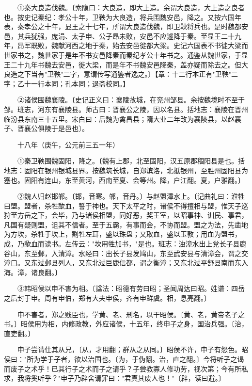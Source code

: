 　　①秦大良造伐魏。〔索隐曰：大良造，即大上造。余谓大良造，大上造之良者也。按史记秦纪：孝公十年，卫鞅为大良造，将兵围魏安邑，降之。又按六国年表，秦孝公之十年，显王之十七年，所谓大良造伐魏，即卫鞅将兵也。是时魏都安邑，其兵犹强，庞涓、太子申、公子昂未败，安邑不应遽降于秦。至显王二十九年，昂军既败，魏献河西之地于秦，始去安邑徙都大梁。史记六国表不书徙大梁而世家书之，魏世家于是年不书安邑降秦而秦纪孝公十年书之。通鉴从魏世家，于显王二十九年书魏去安邑，徙大梁，而是年不书魏安邑降秦，盖亦疑而除去之。但大良造之下当有"卫鞅"二字，意谓传写通鉴者逸之。〕【章：十二行本正有"卫鞅"二字；乙十一行本同；孔本同；退斋校同。】

　　②诸侯围魏襄陵。〔史记正义曰：襄陵故城，在兖州邹县。余按魏境时不至于邹。班志，河东有襄陵县。师古曰：晋襄公之陵，因以名县。括地志：襄陵在晋州临汾县东南三十五里。宋白曰：后魏为禽昌县；隋大业二年改为襄陵县，以赵襄子、晋襄公俱陵于是邑也〕。

　　十八年（庚午，公元前三五一年）

　　①秦卫鞅围魏固阳，降之。〔魏有上郡，北至固阳，汉五原郡稒阳县是也。括地志：固阳在银州银城县界。按魏筑长城，自郑滨洛，北抵银州，至胜州固阳县为塞也。固阳有连山，东至黄河，西南至夏、会等州。降，户江翻。夏，户雅翻。〕

　　②魏人归赵邯郸。〔邯，音寒。郸，音丹。〕与赵盟漳水上。〔记曲礼曰：涖牲曰盟。盟者，杀牲歃血，誓于神也。天下太平之时，诸侯不得擅相与盟，惟天子巡狩至方岳之下，会毕，乃与诸侯相盟，同好恶，奖王室，以昭事神、训民、事君，凡国有疑则盟，诅其不信者。至于五霸，有事而会，不协而盟。盟之为法，先凿地为方坎，杀牲于坎上，割牲左耳，盛以珠盘；又取血，盛以玉敦；用血为盟书，成，乃歃血而读书。左传云："坎用牲加书，"是也。班志：浊漳水出上党长子县鹿谷山，东至邺，入清漳。水经曰：出长子县发鸠山，东至武安县与清漳会，谓之交漳口。又东过邺县列人，又东北过巨鹿信都，谓之衡漳；又东北过平舒县南而东入海。漳，诸良翻。〕

　　③韩昭侯以申不害为相。〔諡法：昭德有劳曰昭；圣闻周达曰昭。姓谱：四岳之后封于申。周有申伯，郑有大夫申侯，齐有申鲜虞。相，息亮翻。〕

　　申不害者，郑之贱臣也，学黄、老、刑名，以干昭侯。〔黄、老，黄帝老子之书。〕昭侯用为相，内修政教，外应诸侯，十五年，终申子之身，国治兵强。〔治，直吏翻。〕

　　申子尝请仕其从兄，〔从，才用翻；群从之从同。〕昭侯不许，申子有怨色。昭侯曰："所为学于子者，欲以治国也。〔为，于伪翻。治，直之翻。〕今将听子之谒而废子之术乎！已其行子之术而子之请乎？子尝教寡人修功劳，视次第；今有所私求，我将奚听乎？"申子乃辟舍请罪曰："君真其废人也！"〔辟，读曰避。〕

